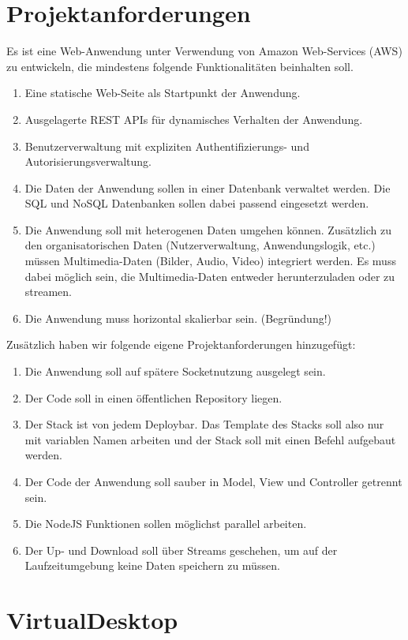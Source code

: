 \documentclass[a4paper, 12pt]{scrreprt}
\renewcommand\_{\textunderscore\allowbreak}
\begin{document}
\section{Projektanforderungen}
Es ist eine Web-Anwendung unter Verwendung von Amazon Web-Services (AWS) zu
entwickeln, die mindestens folgende Funktionalitäten beinhalten soll.
\begin{enumerate}
\item Eine statische Web-Seite als Startpunkt der Anwendung.
\item Ausgelagerte REST APIs für dynamisches Verhalten der Anwendung.
\item Benutzerverwaltung mit expliziten Authentifizierungs- und Autorisierungsverwaltung.
\item Die Daten der Anwendung sollen in einer Datenbank verwaltet werden. Die SQL und NoSQL Datenbanken sollen dabei passend eingesetzt werden.
\item Die Anwendung soll mit heterogenen Daten umgehen können. Zusätzlich zu den
organisatorischen Daten (Nutzerverwaltung, Anwendungslogik, etc.) müssen
Multimedia-Daten (Bilder, Audio, Video) integriert werden. Es muss dabei möglich
sein, die Multimedia-Daten entweder herunterzuladen oder zu streamen.
\item Die Anwendung muss horizontal skalierbar sein. (Begründung!)
\end{enumerate}
\bigskip\bigskip
Zusätzlich haben wir folgende eigene Projektanforderungen hinzugefügt:
\begin{enumerate}
\item Die Anwendung soll auf spätere Socketnutzung ausgelegt sein.
\item Der Code soll in einen öffentlichen Repository liegen.
\item Der Stack ist von jedem Deploybar. Das Template des Stacks soll also nur mit variablen Namen arbeiten und der Stack soll mit einen Befehl aufgebaut werden.
\item Der Code der Anwendung soll sauber in Model, View und Controller getrennt sein. 
\item Die NodeJS Funktionen sollen möglichst parallel arbeiten.
\item Der Up- und Download soll über Streams geschehen, um auf der Laufzeitumgebung keine Daten speichern zu müssen.
\end{enumerate}

\newpage
\section{VirtualDesktop}
\end{document}
